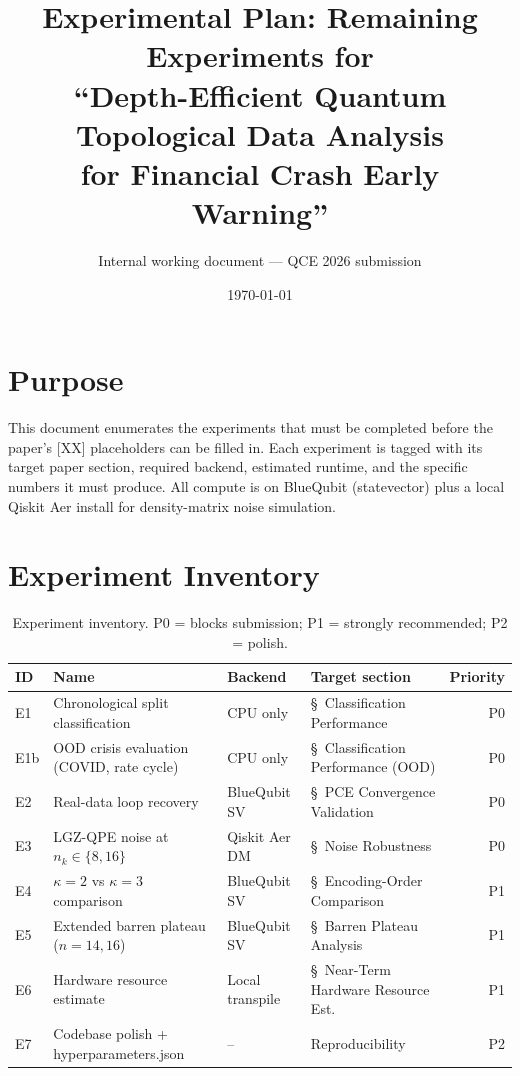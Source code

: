 \documentclass[11pt]{article}
\title{Experimental Plan: Remaining Experiments for\\
``Depth-Efficient Quantum Topological Data Analysis\\for Financial
Crash Early Warning''}
\author{Internal working document --- QCE 2026 submission}
\date{\today}
\begin{document}
\maketitle

\section*{Purpose}

This document enumerates the experiments that must be completed before
the paper's [XX] placeholders can be filled in. Each experiment is
tagged with its target paper section, required backend, estimated
runtime, and the specific numbers it must produce. All compute is on
BlueQubit (statevector) plus a local Qiskit Aer install for
density-matrix noise simulation.

\section{Experiment Inventory}

\begin{table}[h]
\centering
\small
\begin{tabular}{llllr}
\toprule
ID & Name & Backend & Target section & Priority \\
\midrule
E1  & Chronological split classification       & CPU only           & \S~Classification Performance         & P0 \\
E1b & OOD crisis evaluation (COVID, rate cycle)& CPU only           & \S~Classification Performance (OOD)   & P0 \\
E2  & Real-data loop recovery                  & BlueQubit SV       & \S~PCE Convergence Validation         & P0 \\
E3  & LGZ-QPE noise at $n_k\in\{8,16\}$        & Qiskit Aer DM      & \S~Noise Robustness                   & P0 \\
E4  & $\kappa=2$ vs $\kappa=3$ comparison      & BlueQubit SV       & \S~Encoding-Order Comparison          & P1 \\
E5  & Extended barren plateau ($n=14,16$)      & BlueQubit SV       & \S~Barren Plateau Analysis            & P1 \\
E6  & Hardware resource estimate               & Local transpile    & \S~Near-Term Hardware Resource Est.   & P1 \\
E7  & Codebase polish + hyperparameters.json   & --                 & Reproducibility                       & P2 \\
\bottomrule
\end{tabular}
\caption{Experiment inventory. P0 = blocks submission; P1 = strongly
recommended; P2 = polish.}
\end{table}
\end{document}
